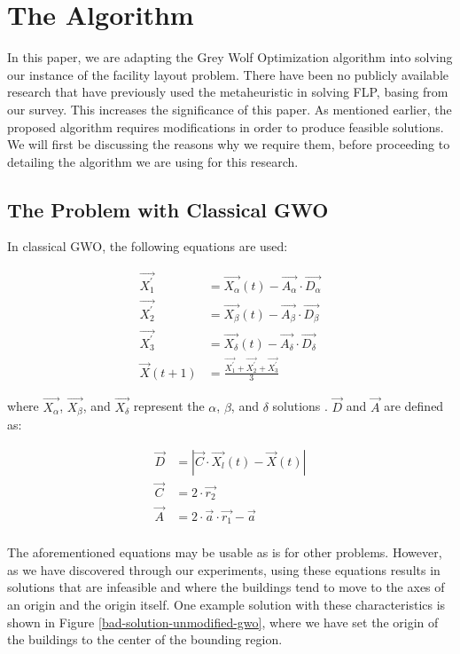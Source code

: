 \section{The Algorithm}
In this paper, we are adapting the Grey Wolf Optimization algorithm into solving our instance of the facility layout problem. There have been no publicly available research that have previously used the metaheuristic in solving FLP, basing from our survey. This increases the significance of this paper. As mentioned earlier, the proposed algorithm requires modifications in order to produce feasible solutions. We will first be discussing the reasons why we require them, before proceeding to detailing the algorithm we are using for this research.

\subsection{The Problem with Classical GWO}
In classical GWO, the following equations are used:

\begin{align}
	\vec{X_{1}^{'}} &= \vec{X_{\alpha}}(t) - \vec{A_{\alpha}} \cdot \vec{D_{\alpha}} \label{gwo-x1-eqn} \\
	\vec{X_{2}^{'}} &= \vec{X_{\beta}}(t) - \vec{A_{\beta}} \cdot \vec{D_{\beta}} \\
	\vec{X_{3}^{'}} &= \vec{X_{\delta}}(t) - \vec{A_{\delta}} \cdot \vec{D_{\delta}} \\
	\vec{X}(t + 1)  &= \frac{\vec{X_{1}^{'}} + \vec{X_{2}^{'}} + \vec{X_{3}^{'}}}{3} \label{gwo-xt1-eqn}
\end{align}

where $\vec{X_{\alpha}}$, $\vec{X_{\beta}}$, and $\vec{X_{\delta}}$ represent the $\alpha$, $\beta$, and $\delta$ solutions \cite{Gupta2018}. $\vec{D}$ and $\vec{A}$ are defined as:

\begin{align*}
	\vec{D}        &= \left | \vec{C} \cdot \vec{X_{l}}(t)
	- \vec{X}(t) \right | \\
	\vec{C}        &= 2 \cdot \vec{r_{2}} \\
	\vec{A}        &= 2 \cdot \vec{a} \cdot \vec{r_{1}}
					  - \vec{a}                \\
\end{align*}

The aforementioned equations may be usable as is for other problems. However, as we have discovered through our experiments, using these equations results in solutions that are infeasible and where the buildings tend to move to the axes of an origin and the origin itself. One example solution with these characteristics is shown in Figure \ref{bad-solution-unmodified-gwo}, where we have set the origin of the buildings to the center of the bounding region.

